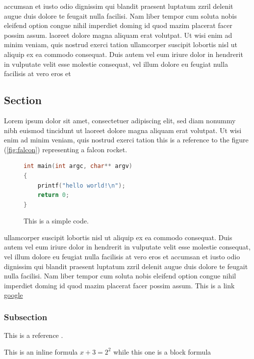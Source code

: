\documentclass[a4paper,10pt]{article}
\begin{document}
accumsan et iusto odio dignissim qui blandit praesent luptatum zzril delenit augue duis dolore te feugait nulla facilisi.
Nam liber tempor cum soluta nobis eleifend option congue nihil imperdiet doming id quod mazim placerat facer possim assum.
laoreet dolore magna aliquam erat volutpat. Ut wisi enim ad minim veniam, quis nostrud exerci tation
ullamcorper suscipit lobortis nisl ut aliquip ex ea commodo consequat. Duis autem vel eum iriure dolor in hendrerit in
vulputate velit esse molestie consequat, vel illum dolore eu feugiat nulla facilisis at vero eros et


\subsection{Section}

Lorem ipsum
dolor sit amet, consectetuer adipiscing elit, sed diam nonummy nibh euismod tincidunt ut
laoreet dolore magna aliquam erat volutpat. Ut wisi enim ad minim veniam, quis nostrud exerci tation this is a reference to the figure (\ref{fig:falcon}) representing a falcon rocket.

\begin{figure}
\begin{center}

\begin{lstlisting}[language=c]
int main(int argc, char** argv)
{
    printf("hello world!\n");
    return 0;
}
\end{lstlisting}

\caption{This is a simple code.}
\end{center}
\end{figure}

ullamcorper suscipit lobortis nisl ut aliquip ex ea commodo consequat. Duis autem vel eum iriure dolor in hendrerit in
vulputate velit esse molestie consequat, vel illum dolore eu feugiat nulla facilisis at vero eros et
accumsan et iusto odio dignissim qui blandit praesent luptatum zzril delenit augue duis dolore te feugait nulla facilisi.
Nam liber tempor cum soluta nobis eleifend option congue nihil imperdiet doming id quod mazim placerat facer possim assum.
This is a link \href{www.google.com"}{google}


\subsubsection{Subsection}

This is a reference \cite{fnref:1}.


This is an inline formula \(x+3 = 2^2\) while this one is a block formula
\end{document}
